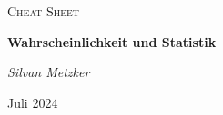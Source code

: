 \documentclass[a4paper, 10pt]{article}
\begin{document}
\setlength{\abovedisplayskip}{3pt}
\setlength{\belowdisplayskip}{3pt}
\setlength{\abovedisplayshortskip}{3pt}
\setlength{\belowdisplayshortskip}{3pt}

\begin{center}
	\vspace{1cm}
	{\Large \textsc{Cheat Sheet}\par}
	{\huge\bfseries Wahrscheinlichkeit und Statistik\par}
	\vspace{0.25cm}
	{\Large\itshape Silvan Metzker\par}
	{\large Juli 2024\par}
\end{center}

\setlength{\parindent}{0pt}










\end{document}
